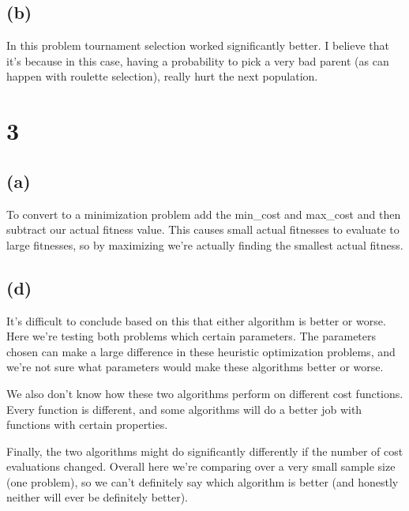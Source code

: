 \documentclass[12pt]{article}
\begin{document}
\subsection{(b)}
In this problem tournament selection worked significantly better.  I believe that it's because in this case, having a probability to pick a very bad parent (as can happen with roulette selection), really hurt the next population.

\section{3}
\subsection{(a)}
To convert to a minimization problem add the min\_cost and max\_cost and then subtract our actual fitness value.  This causes small actual fitnesses to evaluate to large fitnesses, so by maximizing we're actually finding the smallest actual fitness.

\subsection{(d)}
It's difficult to conclude based on this that either algorithm is better or worse.  Here we're testing both problems which certain parameters.  The parameters chosen can make a large difference in these heuristic optimization problems, and we're not sure what parameters would make these algorithms better or worse.

We also don't know how these two algorithms perform on different cost functions.  Every function is different, and some algorithms will do a better job with functions with certain properties.

Finally, the two algorithms might do significantly differently if the number of cost evaluations changed.  Overall here we're comparing over a very small sample size (one problem), so we can't definitely say which algorithm is better (and honestly neither will ever be definitely better).
\end{document}
